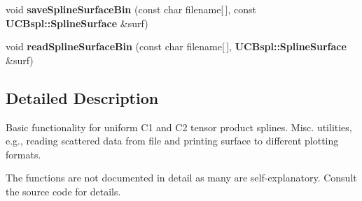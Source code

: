 \begin{DoxyCompactItemize}
\item 
void {\bfseries saveSplineSurfaceBin} (const char filename[$\,$], const {\bf UCBspl::SplineSurface} \&surf)\label{namespaceUCBspl_af4e7e7c457f9f91dc3e197c1c59318e9}

\item 
void {\bfseries readSplineSurfaceBin} (const char filename[$\,$], {\bf UCBspl::SplineSurface} \&surf)\label{namespaceUCBspl_a175e6a4a56db7526e708fa5292a3ddcb}

\end{DoxyCompactItemize}


\subsection{Detailed Description}
Basic functionality for uniform C1 and C2 tensor product splines. Misc. utilities, e.g., reading scattered data from file and printing surface to different plotting formats.

The functions are not documented in detail as many are self-\/explanatory. Consult the source code for details. 